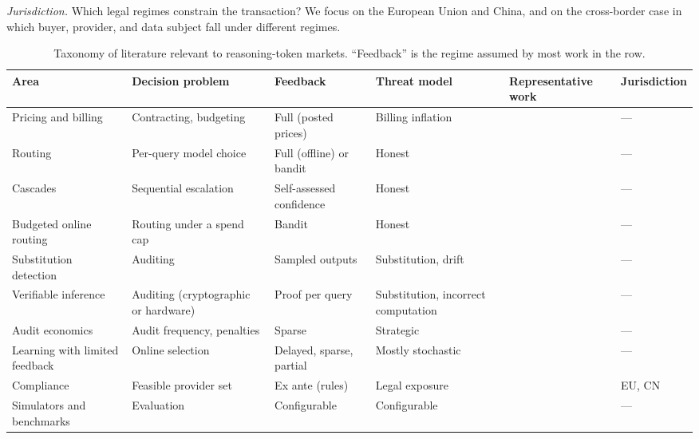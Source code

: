 \documentclass[sigconf]{acmart}
\begin{document}
\emph{Jurisdiction.} Which legal regimes constrain the transaction? We focus on the European Union and China, and on the cross-border case in which buyer, provider, and data subject fall under different regimes.


\begin{table}[t]
  \caption{Taxonomy of literature relevant to reasoning-token markets. ``Feedback'' is the regime assumed by most work in the row.}
  \label{tab:taxonomy}
  \centering
  \small
  \begin{tabular}{p{}p{}p{}p{}p{}p{}}
    \toprule
    Area & Decision problem & Feedback & Threat model & Representative work & Jurisdiction \\
    \midrule
    Pricing and billing & Contracting, budgeting & Full (posted prices) & Billing inflation & \cite{duetting2024mechanism,velasco2025overcharging,han2024tokenbudget,sun2025coin,hoque2026tokeninflation} & --- \\
    Routing & Per-query model choice & Full (offline) or bandit & Honest & \cite{ong2025routellm,ding2024hybrid,shnitzer2023routing,hu2024routerbench} & --- \\
    Cascades & Sequential escalation & Self-assessed confidence & Honest & \cite{chen2023frugalgpt,yue2024cascades,aggarwal2024automix} & --- \\
    Budgeted online routing & Routing under a spend cap & Bandit & Honest & \cite{panda2025pilot,li2026stageroute,badanidiyuru2018bwk} & --- \\
    Substitution detection & Auditing & Sampled outputs & Substitution, drift & \cite{gao2025equality,cai2025substitution,sun2025idiosyncrasies,pasquini2025llmmap} & --- \\
    Verifiable inference & Auditing (cryptographic or hardware) & Proof per query & Substitution, incorrect computation & \cite{sun2024zkllm,chen2024zkml,tramer2019slalom,ong2025toploc} & --- \\
    Audit economics & Audit frequency, penalties & Sparse & Strategic & \cite{becker1968crime,border1987samurai,avenhaus2002inspection,polinsky2000enforcement} & --- \\
    Learning with limited feedback & Online selection & Delayed, sparse, partial & Mostly stochastic & \cite{joulani2013delayed,vernade2017delayed,bartok2014partial,cesabianchi2005label} & --- \\
    Compliance & Feasible provider set & Ex ante (rules) & Legal exposure & \cite{eu2024aiact,cac2023genai,cac2024crossborder,eu2016gdpr} & EU, CN \\
    Simulators and benchmarks & Evaluation & Configurable & Configurable & \cite{hu2024routerbench,zheng2022aieconomist,fish2024collusion,backlund2025vending,lu2025routerarena} & --- \\
    \bottomrule
  \end{tabular}
\end{table}
\end{document}
